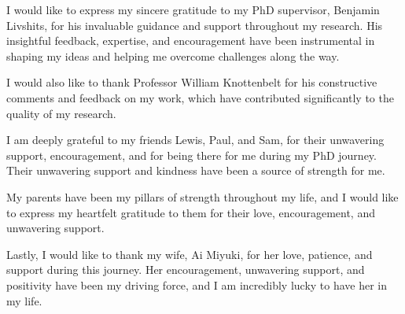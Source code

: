 \cleardoublepage

\begin{acknowledgements}
I would like to express my sincere gratitude to my PhD supervisor, Benjamin Livshits, for his invaluable guidance and support throughout my research. His insightful feedback, expertise, and encouragement have been instrumental in shaping my ideas and helping me overcome challenges along the way.

I would also like to thank Professor William Knottenbelt for his constructive comments and feedback on my work, which have contributed significantly to the quality of my research.

I am deeply grateful to my friends Lewis, Paul, and Sam, for their unwavering support, encouragement, and for being there for me during my PhD journey. Their unwavering support and kindness have been a source of strength for me.

My parents have been my pillars of strength throughout my life, and I would like to express my heartfelt gratitude to them for their love, encouragement, and unwavering support.

Lastly, I would like to thank my wife, Ai Miyuki, for her love, patience, and support during this journey.
Her encouragement, unwavering support, and positivity have been my driving force, and I am incredibly lucky to have her in my life.

\end{acknowledgements}
